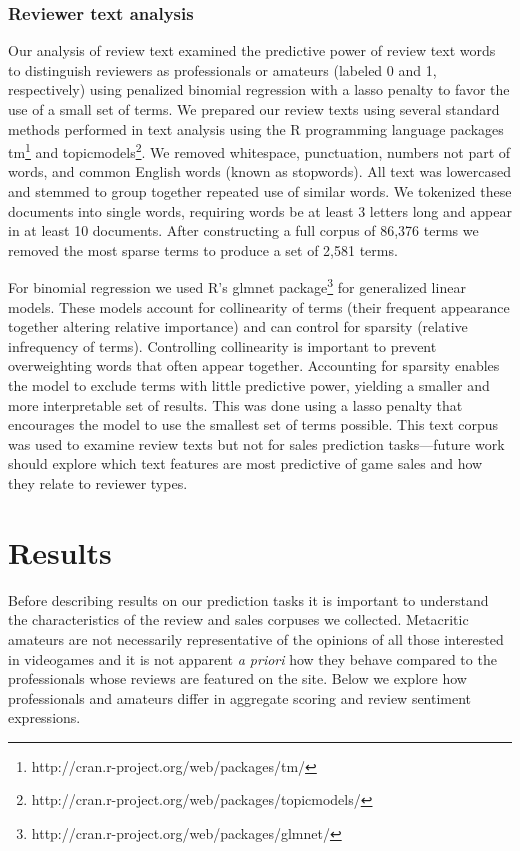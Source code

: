 \documentclass[letterpaper]{article}
\begin{document}
\subsubsection{Reviewer text analysis}
Our analysis of review text examined the predictive power of review text words to distinguish reviewers as professionals or amateurs (labeled 0 and 1, respectively) using penalized binomial regression with a lasso penalty to favor the use of a small set of terms. 
We prepared our review texts using several standard methods performed in text analysis using the R programming language packages tm\footnote{http://cran.r-project.org/web/packages/tm/} and topicmodels\footnote{http://cran.r-project.org/web/packages/topicmodels/}. We removed whitespace, punctuation, numbers not part of words, and common English words (known as stopwords). All text was lowercased and stemmed to group together repeated use of similar words. We tokenized these documents into single words, requiring words be at least 3 letters long and appear in at least 10 documents. After constructing a full corpus of 86,376 terms we removed the most sparse terms to produce a set of 2,581 terms.

For binomial regression we used R's glmnet package\footnote{http://cran.r-project.org/web/packages/glmnet/} for generalized linear models. These models account for collinearity of terms (their frequent appearance together altering relative importance) and can control for sparsity (relative infrequency of terms). Controlling collinearity is important to prevent overweighting words that often appear together. Accounting for sparsity enables the model to exclude terms with little predictive power, yielding a smaller and more interpretable set of results. This was done using a lasso penalty that encourages the model to use the smallest set of terms possible. This text corpus was used to examine review texts but not for sales prediction tasks---future work should explore which text features are most predictive of game sales and how they relate to reviewer types.


\section{Results}

Before describing results on our prediction tasks it is important to understand the characteristics of the review and sales corpuses we collected. Metacritic amateurs are not necessarily representative of the opinions of all those interested in videogames and it is not apparent \textit{a priori} how they behave compared to the professionals whose reviews are featured on the site. Below we explore how professionals and amateurs differ in aggregate scoring and review sentiment expressions.
\end{document}
